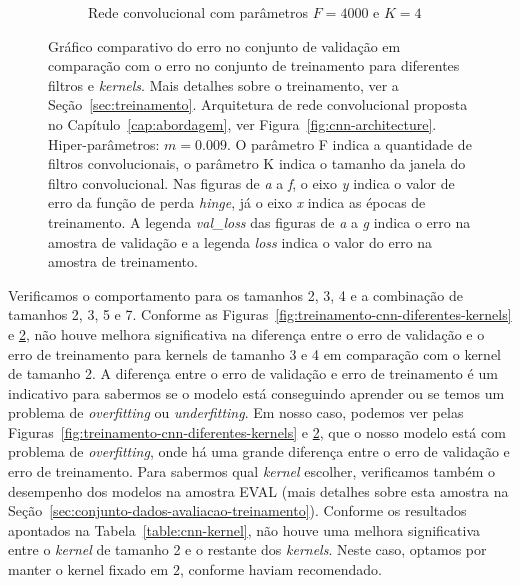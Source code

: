 \begin{figure}[H]
\begin{subfigure}{.5\textwidth}
  \caption{Rede convolucional com parâmetros $F = 4000$ e $K = 4$}
  \label{fig:cnn-4000-k-4}
\end{subfigure}
\caption[Gráfico comparativo do erro no conjunto de validação em comparação com o erro no conjunto de treinamento para diferentes filtros e \textit{kernels}.]{Gráfico comparativo do erro no conjunto de validação em comparação com o erro no conjunto de treinamento para diferentes filtros e \textit{kernels}. Mais detalhes sobre o treinamento, ver a Seção~\ref{sec:treinamento}. Arquitetura de rede convolucional proposta no Capítulo~\ref{cap:abordagem}, ver Figura~\ref{fig:cnn-architecture}. Hiper-parâmetros: $m = 0.009$. O parâmetro F indica a quantidade de filtros convolucionais, o parâmetro K indica o tamanho da janela do filtro convolucional. Nas figuras de \emph{a} a \emph{f}, o eixo \emph{y} indica o valor de erro da função de perda \textit{hinge}, já o eixo \emph{x} indica as épocas de treinamento. A legenda \emph{val\_loss} das figuras de \emph{a} a \emph{g} indica o erro na amostra de validação e a legenda \emph{loss} indica o valor do erro na amostra de treinamento. }
\label{fig:treinamento-cnn-diferentes-kernels-2}
\end{figure}


Verificamos o comportamento para os tamanhos 2, 3, 4 e a combinação de tamanhos 2, 3, 5 e 7. Conforme as Figuras~\ref{fig:treinamento-cnn-diferentes-kernels} e \ref{fig:treinamento-cnn-diferentes-kernels-2}, não houve melhora significativa na diferença entre o erro de validação e o erro de treinamento para kernels de tamanho 3 e 4 em comparação com o kernel de tamanho 2. A diferença entre o erro de validação e erro de treinamento é um indicativo para sabermos se o modelo está conseguindo aprender ou se temos um problema de \textit{overfitting} ou \textit{underfitting}. Em nosso caso, podemos ver pelas Figuras~\ref{fig:treinamento-cnn-diferentes-kernels} e \ref{fig:treinamento-cnn-diferentes-kernels-2}, que o nosso modelo está com problema de \textit{overfitting}, onde há uma grande diferença entre o erro de validação e erro de treinamento. Para sabermos qual \textit{kernel} escolher, verificamos também o desempenho dos modelos na amostra EVAL (mais detalhes sobre esta amostra na Seção~\ref{sec:conjunto-dados-avaliacao-treinamento}). Conforme os resultados apontados na Tabela~\ref{table:cnn-kernel}, não houve uma melhora significativa entre o \textit{kernel} de tamanho 2 e o restante dos \textit{kernels}. Neste caso, optamos por manter o kernel fixado em $2$, conforme \cite{tan-lstm-qa} haviam recomendado.


